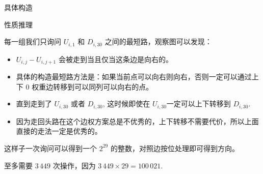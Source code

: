 \documentclass{beamer}
\begin{document}
{\begin{frame}{具体构造}
\end{frame}

\begin{frame}{性质推理}

每一组我们只询问 $U_{i, 1}$ 和 $D_{i, 30}$ 之间的最短路，观察图可以发现：
\begin{itemize}
  \item $U_{i, j} - U_{i, j + 1}$ 会被走到当且仅当这条边是向右的。
  \item 具体的构造最短路方法是：如果当前点可以向右则向右，否则一定可以通过上下 $0$ 权重边转移到可以同列可以向右的点。
  \item 直到走到了 $U_{i, 30}$ 或者 $D_{i, 30}$, 这时候即使在 $U_{i, 30}$一定可以上下转移到 $D_{i, 30}$.
  \item 因为走回头路在这个边权方案总是不优秀的，上下转移不需要代价，所以上面直接的走法一定是优秀的。
\end{itemize}

这样子一次询问可以得到一个 $2^{29}$ 的整数，对照边按位处理即可得到方向。

至多需要 $3\,449$ 次操作，因为 $3\,449 \times 29 = 100\,021$.

\end{frame}

}
\end{document}

